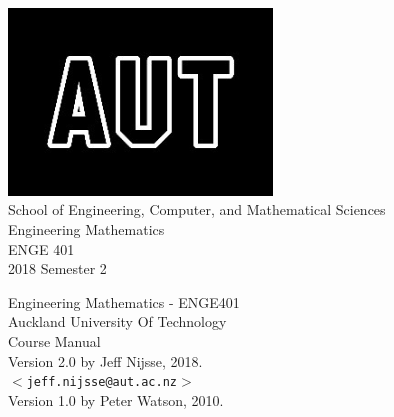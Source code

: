 \documentclass[a4paper,12pt,openany]{book}
\begin{document}
\frontmatter
\begin{titlepage}
\begin{center}

\includegraphics[width=7cm]{AUTlogo}\\
{\vspace{2cm}}
 {\Large School of Engineering, Computer, and Mathematical Sciences}
 \vspace{3cm}\\
 {\huge Engineering Mathematics}\\
 \vspace{1cm}
{\huge ENGE 401} \\
 \vspace{1cm}
{\huge 2018 Semester 2} \\
 \vfill
\end{center}
\end{titlepage}

\clearpage\thispagestyle{empty}
\vspace*{\fill}
Engineering Mathematics - ENGE401\\
Auckland University Of Technology\\
Course Manual\\

Version 2.0 by Jeff Nijsse, 2018.\\
$<$\texttt{jeff.nijsse@aut.ac.nz}$>$\\
Version 1.0 by Peter Watson, 2010.

%
\clearpage
\tableofcontents

%

\mainmatter








%

\backmatter
%
%
\end{document}
